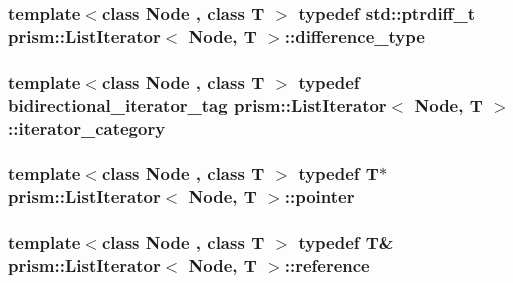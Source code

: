 \subsubsection[{\texorpdfstring{difference\+\_\+type}{difference_type}}]{\setlength{\rightskip}{0pt plus 5cm}template$<$class Node , class T $>$ typedef std\+::ptrdiff\+\_\+t {\bf prism\+::\+List\+Iterator}$<$ Node, T $>$\+::{\bf difference\+\_\+type}}\hypertarget{structprism_1_1_list_iterator_a1353d7adf61676d3913acaa1b00fed94}{}\label{structprism_1_1_list_iterator_a1353d7adf61676d3913acaa1b00fed94}
\subsubsection[{\texorpdfstring{iterator\+\_\+category}{iterator_category}}]{\setlength{\rightskip}{0pt plus 5cm}template$<$class Node , class T $>$ typedef bidirectional\+\_\+iterator\+\_\+tag {\bf prism\+::\+List\+Iterator}$<$ Node, T $>$\+::{\bf iterator\+\_\+category}}\hypertarget{structprism_1_1_list_iterator_a3accec188667cc3b84dca49151b83b95}{}\label{structprism_1_1_list_iterator_a3accec188667cc3b84dca49151b83b95}
\subsubsection[{\texorpdfstring{pointer}{pointer}}]{\setlength{\rightskip}{0pt plus 5cm}template$<$class Node , class T $>$ typedef T$\ast$ {\bf prism\+::\+List\+Iterator}$<$ Node, T $>$\+::{\bf pointer}}\hypertarget{structprism_1_1_list_iterator_a7df7f6f08916f0bbe2e0b0ce675e0cee}{}\label{structprism_1_1_list_iterator_a7df7f6f08916f0bbe2e0b0ce675e0cee}
\subsubsection[{\texorpdfstring{reference}{reference}}]{\setlength{\rightskip}{0pt plus 5cm}template$<$class Node , class T $>$ typedef T\& {\bf prism\+::\+List\+Iterator}$<$ Node, T $>$\+::{\bf reference}}\hypertarget{structprism_1_1_list_iterator_a8102dfe3c26bb09d44c54ce276debf69}{}\label{structprism_1_1_list_iterator_a8102dfe3c26bb09d44c54ce276debf69}
